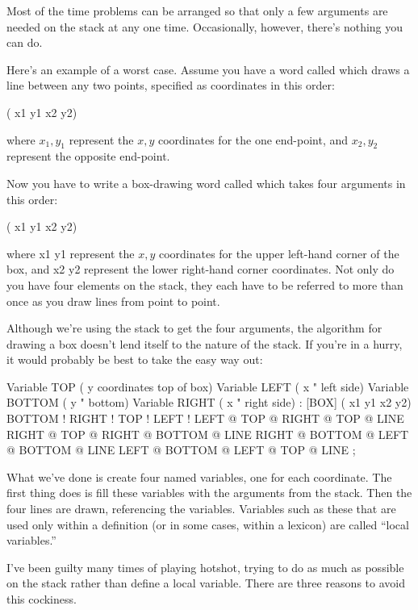Most of the time problems can be arranged so that only a few arguments
are needed on the stack at any one time. Occasionally, however, there's
nothing you can do.

Here's an example of a worst case. Assume you have a word called
 which draws a line between any two points, specified as
coordinates in this order:

\begin{Code}
( x1 y1 x2 y2)
\end{Code}
where $x_1,y_1$ represent the $x,y$ coordinates for the one end-point, and
$x_2,y_2$ represent the opposite end-point.

Now you have to write a box-drawing word called \forth{[BOX]} which
takes four arguments in this order:

\begin{Code}
( x1 y1 x2 y2)
\end{Code}
where x1 y1 represent the $x,y$ coordinates for the upper left-hand corner
of the box, and x2 y2 represent the lower right-hand corner coordinates.
Not only do you have four elements on the stack, they each have to
be referred to more than once as you draw lines from point to point.

Although we're using the stack to get the four arguments, the algorithm
for drawing a box doesn't lend itself to the nature of the stack. If you're
in a hurry, it would probably be best to take the easy way out:

\begin{Code}
Variable TOP         ( y coordinates top of box)
Variable LEFT        ( x     "       left side)
Variable BOTTOM      ( y     "       bottom)
Variable RIGHT       ( x     "       right side)
: [BOX]   ( x1 y1 x2 y2)   BOTTOM !  RIGHT !  TOP !  LEFT !
   LEFT @ TOP @  RIGHT @ TOP @  LINE
   RIGHT @ TOP @  RIGHT @ BOTTOM @  LINE
   RIGHT @ BOTTOM @  LEFT @ BOTTOM @  LINE
   LEFT @ BOTTOM @  LEFT @ TOP @  LINE ;
\end{Code}
What we've done is create four named variables, one for each coordinate.
The first thing \forth{[BOX]} does is fill these variables with the
arguments from the stack. Then the four lines are drawn, referencing the
variables.  Variables such as these that are used only within a definition
(or in some cases, within a lexicon) are called ``local variables.''

I've been guilty many times of playing hotshot, trying to do as
much as possible on the stack rather than define a local variable. There
are three reasons to avoid this cockiness.

